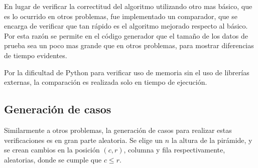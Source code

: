 \documentclass{article}
\theoremstyle{default}
\begin{document}
	En lugar de verificar la correctitud del algoritmo utilizando otro mas básico, que es lo ocurrido en otros problemas, fue implementado un comparador, que se encarga de verificar que tan rápido es el algoritmo mejorado respecto al básico. Por esta razón se permite en el código generador que el tamaño de los datos de prueba sea un poco mas grande que en otros problemas, para mostrar diferencias de tiempo evidentes.

	Por la dificultad de Python para verificar uso de memoria sin el uso de librerías externas, la comparación es realizada solo en tiempo de ejecución.

	\subsection{Generación de casos}
		Similarmente a otros problemas, la generación de casos para realizar estas verificaciones es en gran parte aleatoria. Se elige un $n$ la altura de la pirámide, y se crean cambios en la posición $(c,r)$, columna y fila respectivamente, aleatorias, donde se cumple que $c \leq r$.
%
%
%
\end{document}
